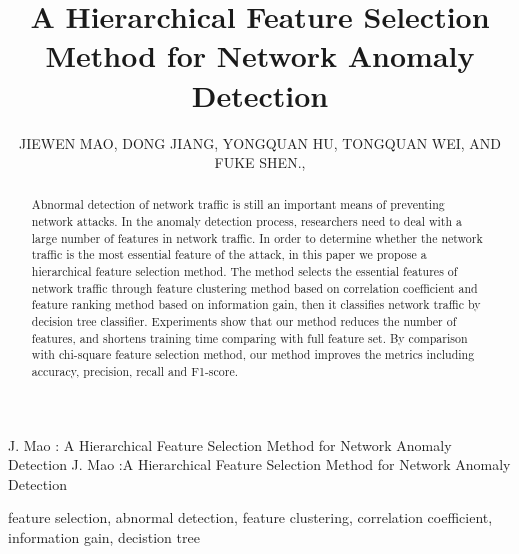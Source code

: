 \documentclass{ieeeaccess}
\theoremstyle{definition}
\begin{document}

\title{A Hierarchical Feature Selection Method for Network Anomaly Detection}
\author{\uppercase{Jiewen Mao},
\uppercase{Dong Jiang, Yongquan Hu, Tongquan Wei, and Fuke Shen}.,}
\address{School of Computer Science and Technology, East China Normal University, Shanghai 200062, China}

\markboth
{J. Mao \headeretal: A Hierarchical Feature Selection Method for Network Anomaly Detection}
{J. Mao \headeretal:A Hierarchical Feature Selection Method for Network Anomaly Detection}


\begin{abstract}
    Abnormal detection of network traffic is still an important means of preventing network attacks. In the anomaly detection process, researchers need to deal with a large number of features in network traffic. In order to determine whether the network traffic is the most essential feature of the attack, in this paper we propose a hierarchical feature selection method. The method selects the essential features of network traffic through feature clustering method based on correlation coefficient and feature ranking method based on information gain, then it classifies network traffic by decision tree classifier. Experiments show that our method reduces the number of features, and shortens training time comparing with full feature set. By comparison with chi-square feature selection method, our method improves the metrics including accuracy, precision, recall and F1-score.
\end{abstract}

\begin{keywords}
    feature selection, abnormal detection, feature clustering, correlation coefficient, information gain, decistion tree
\end{keywords}

\titlepgskip=-15pt

\maketitle
\end{document}
